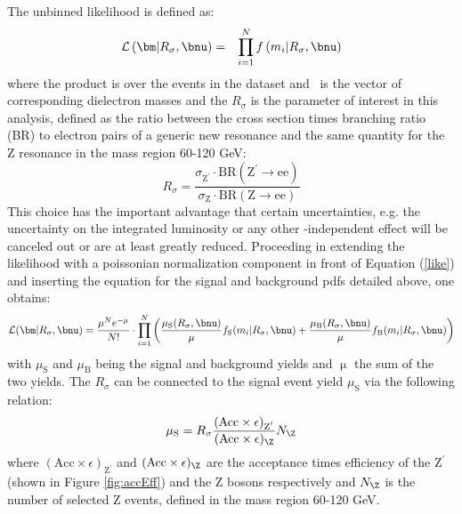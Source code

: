 The unbinned likelihood is defined as:
\begin{eqnarray}
\label{like}
 \mathcal{L}\left( \bm \vert R_\sigma, \bnu \right) & = & \prod_{i=1}^{N} f\left(m_i \vert R_\sigma, \bnu \right)
\end{eqnarray}
where the product is over the events in the dataset and \bm\ is the vector of corresponding dielectron masses and the $R_\sigma$ is the parameter of interest in this analysis, defined as the ratio between the cross section times branching ratio (BR) to electron pairs of a generic new resonance and the same quantity for the Z resonance in the mass region 60-120 GeV:
\begin{equation}
R_{\sigma}=\frac{\sigma_{\mathrm{Z^{'}}}\cdot\mathrm{BR(Z^{'}\rightarrow ee)}}{\sigma_{\mathrm{Z}}\cdot\mathrm{BR(Z\rightarrow ee)}}
\end{equation}
This choice has the important advantage that certain uncertainties, e.g. the uncertainty on the integrated luminosity or any other \et-independent effect will be canceled out or are at least greatly reduced.
Proceeding in extending the likelihood with a poissonian normalization component in front of Equation (\ref{like}) and inserting the equation for the signal and background pdfs detailed above, one obtains:
\begin{equation}
\mathcal{L}(\bm|R_\sigma,\bnu) =
  \frac{\mu^Ne^{-\mu}}{N!} \cdot
    \prod_{i=1}^{N}
      \left(
        \frac{\mu_\mathrm{S}(R_\sigma,\bnu)}{\mu}f_\mathrm{S}(m_i|R_\sigma,\bnu)
        + \frac{\mu_\mathrm{B}(R_\sigma,\bnu)}{\mu}f_\mathrm{B}(m_i|R_\sigma,\bnu)
      \right)
      \label{eq:ext_likelihood}
\end{equation}
with $\mu_{\mathrm{S}}$ and $\mu_{\mathrm{B}}$ being the signal and background yields and $\upmu$ the sum of the two yields.
The $R_{\sigma}$ can be connected to the signal event yield $\mu_{\mathrm{S}}$ via the following relation:
\begin{equation}
\label{eq:musig}
\mu_{\mathrm{S}} = R_\sigma \frac{(\mathrm{Acc}\times\epsilon)_{\mathrm{Z}^{'}}}{(\mathrm{Acc}\times\epsilon)_{\Z}} N_{\Z}
\end{equation}
where $(\mathrm{Acc}\times\epsilon)_{\mathrm{Z}^{'}}$ and $(\mathrm{Acc}\times\epsilon)_{\Z}$ are the acceptance times efficiency of the $\mathrm{Z^{'}}$ (shown in Figure \ref{fig:accEff}) and the Z bosons respectively and $N_{\Z}$ is the number of selected Z events, defined in the mass region 60-120 GeV.



